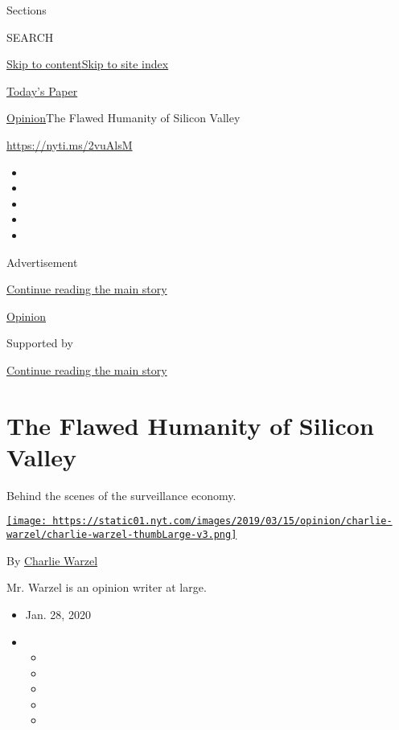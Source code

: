 Sections

SEARCH

\protect\hyperlink{site-content}{Skip to
content}\protect\hyperlink{site-index}{Skip to site index}

\href{https://myaccount.nytimes.com/auth/login?response_type=cookie\&client_id=vi}{}

\href{https://www.nytimes.com/section/todayspaper}{Today's Paper}

\href{/section/opinion}{Opinion}\textbar{}The Flawed Humanity of Silicon
Valley

\url{https://nyti.ms/2vuAlsM}

\begin{itemize}
\item
\item
\item
\item
\item
\end{itemize}

Advertisement

\protect\hyperlink{after-top}{Continue reading the main story}

\href{/section/opinion}{Opinion}

Supported by

\protect\hyperlink{after-sponsor}{Continue reading the main story}

\hypertarget{the-flawed-humanity-of-silicon-valley}{%
\section{The Flawed Humanity of Silicon
Valley}\label{the-flawed-humanity-of-silicon-valley}}

Behind the scenes of the surveillance economy.

\href{https://www.nytimes.com/by/charlie-warzel}{\texttt{[image: https://static01.nyt.com/images/2019/03/15/opinion/charlie-warzel/charlie-warzel-thumbLarge-v3.png]}}

By \href{https://www.nytimes.com/by/charlie-warzel}{Charlie Warzel}

Mr. Warzel is an opinion writer at large.

\begin{itemize}
\item
  Jan. 28, 2020
\item
  \begin{itemize}
  \item
  \item
  \item
  \item
  \item
  \end{itemize}
\end{itemize}

